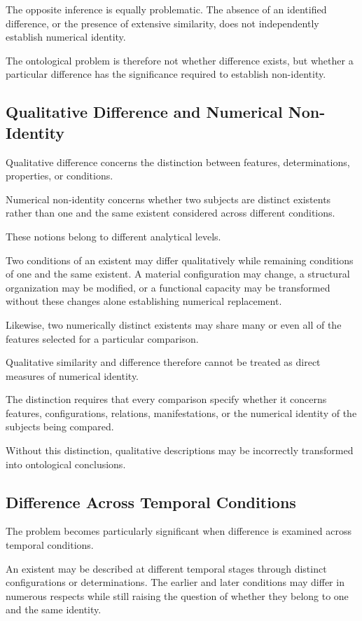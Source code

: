 The opposite inference is equally problematic.
The absence of an identified difference, or the
presence of extensive similarity, does not independently
establish numerical identity.

The ontological problem is therefore not whether
difference exists, but whether a particular difference
has the significance required to establish non-identity.

\subsection{Qualitative Difference and Numerical Non-Identity}

Qualitative difference concerns the distinction between
features, determinations, properties, or conditions.

Numerical non-identity concerns whether two subjects
are distinct existents rather than one and the same
existent considered across different conditions.

These notions belong to different analytical levels.

Two conditions of an existent may differ qualitatively
while remaining conditions of one and the same existent.
A material configuration may change, a structural
organization may be modified, or a functional capacity
may be transformed without these changes alone
establishing numerical replacement.

Likewise, two numerically distinct existents may share
many or even all of the features selected for a particular
comparison.

Qualitative similarity and difference therefore cannot
be treated as direct measures of numerical identity.

The distinction requires that every comparison specify
whether it concerns features, configurations, relations,
manifestations, or the numerical identity of the
subjects being compared.

Without this distinction, qualitative descriptions
may be incorrectly transformed into ontological
conclusions.

\subsection{Difference Across Temporal Conditions}

The problem becomes particularly significant when
difference is examined across temporal conditions.

An existent may be described at different temporal
stages through distinct configurations or determinations.
The earlier and later conditions may differ in numerous
respects while still raising the question of whether
they belong to one and the same identity.

